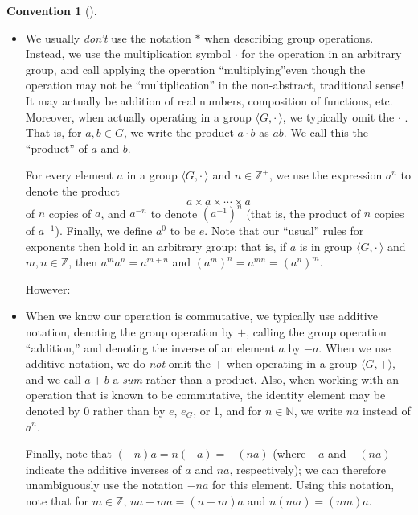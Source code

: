 \documentclass[10pt,openany,oneside]{book}
\theoremstyle{plain}
\theoremstyle{definition}
\theoremstyle{definition}
\newtheorem{convention}[theorem]{Convention}
\theoremstyle{definition}
\theoremstyle{definition}
\numberwithin{equation}{section}
\def\Z{\mathbb{Z}}
\def\N{\mathbb{N}}
\def\Gdot{\langle G, \cdot\,\rangle}
\begin{document}
\begin{convention}[]\label{convention-1}
\leavevmode%
\begin{itemize}[label=\textbullet]
\item{}We usually \emph{don't} use the notation \(*\) when describing group operations. Instead, we use the multiplication symbol \(\cdot\) for the operation in an arbitrary group, and  call applying the operation ``multiplying''\textemdash{}even though the operation may not be ``multiplication'' in the non-abstract, traditional sense! It may actually be addition of real numbers, composition of functions, etc. Moreover, when actually operating in a group \(\langle G, \cdot\,\rangle\), we typically omit the \(\cdot\) . That is, for \(a,b\in G\), we write the product \(a\cdot b\) as \(ab\). We call this the ``product'' of \(a\) and \(b\).%
\par
For every element \(a\) in a group \(\Gdot\) and \(n\in \Z^+\), we use the expression \(a^n\) to denote  the product%
\begin{equation*}
a \times a \times \cdots \times a
\end{equation*}
of \(n\) copies of \(a\), and \(a^{-n}\) to denote \((a^{-1})^n\) (that is, the product of \(n\) copies of \(a^{-1}\)). Finally, we define \(a^0\) to be \(e\).  Note that our ``usual'' rules for exponents then hold in an arbitrary group: that is, if \(a\) is in group \(\langle G, \cdot\,\rangle\) and \(m,n\in \Z\), then \(a^m a^n = a^{m+n}\) and \((a^m)^n=a^{mn}=(a^n)^m\).%
\par
However:%
\item{}\label{notation-37}
 When we know our operation is commutative, we typically use additive notation, denoting the group operation by \(+\), calling the group operation ``addition,'' and denoting the inverse of an element \(a\) by \(-a\). When we use additive notation, we do \emph{not} omit the \(+\) when operating in a group \(\langle G,+\rangle\), and we call \(a+b\) a \emph{sum} rather than a product. Also, when working with an operation that is known to be commutative,  the identity element may be denoted by 0 rather than by \(e\), \(e_G\), or 1, and for \(n\in \N\), we write \(na\) instead of \(a^n\).%
\par
Finally, note that \((-n)a=n(-a)=-(na)\) (where \(-a\) and \(-(na)\) indicate the additive inverses of \(a\) and \(na\), respectively); we can therefore unambiguously use the notation \(-na\) for this element. Using this notation, note that for \(m\in \Z\), \(na+ma=(n+m)a\) and \(n(ma)=(nm)a\).%
\end{itemize}
%
\end{convention}
\end{document}
